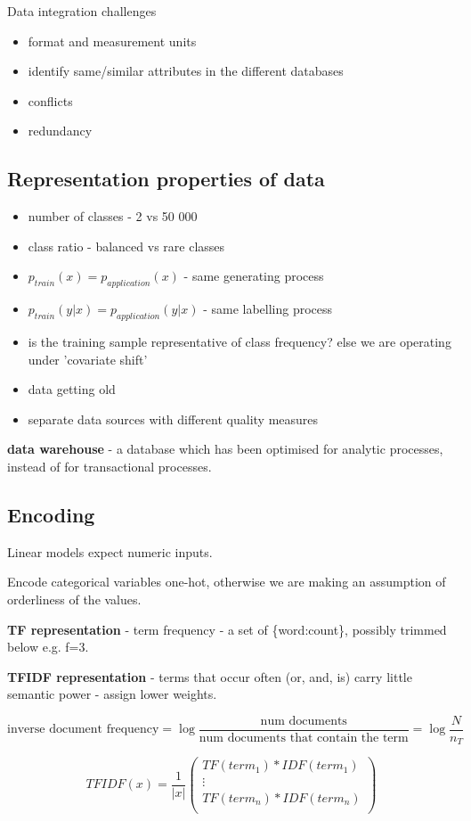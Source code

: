 \documentclass{article}
\newcommand{\para}[0]{\par\vspace{0.2cm}\noindent}
\newcommand{\define}[2]{\textbf{#1} - {#2}.  \para}
\begin{document}
Data integration challenges
\begin{itemize}
    \item{format and measurement units}
    \item{identify same/similar attributes in the different databases}
    \item{conflicts}
    \item{redundancy}
\end{itemize}


\subsection{Representation properties of data}
\begin{itemize}
    \item{number of classes - 2 vs 50 000}
    \item{class ratio - balanced vs rare classes}
    \item{$p_{train}(x) = p_{application}(x)$ - same generating process}
    \item{$p_{train}(y|x) = p_{application}(y|x)$ - same labelling process}
    \item{is the training sample representative of class frequency? else we are operating under 'covariate shift'}
    \item{data getting old}
    \item{separate data sources with different quality measures}
\end{itemize}
\para
\define{data warehouse}
           {a database which has been optimised for analytic processes, instead of for transactional processes}


\subsection{Encoding}
Linear models expect numeric inputs.
\para
Encode categorical variables one-hot, otherwise we are making an assumption of orderliness of the values.
\para
\define{TF representation}
           {term frequency - a set of \{word:count\},
            possibly trimmed below e.g. f=3}
\define{TFIDF representation}
           {terms that occur often (or, and, is) carry little semantic power - assign lower weights}
            $$\text{inverse document frequency}
                = \log \frac{\text{num documents}}{\text{num documents that contain the term}}
                = \log \frac{N}{n_T}$$

$$
TFIDF(x) = \frac{1}{|x|}
 \begin{pmatrix}
  TF({term}_1) * IDF({term}_1)  \\
  \vdots  \\
  TF({term}_n) * IDF({term}_n)  \\
 \end{pmatrix}
$$
\end{document}

